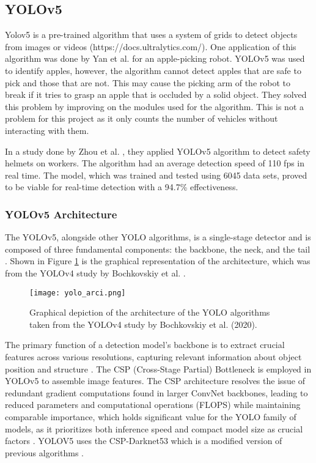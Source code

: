 \subsection{YOLOv5}

Yolov5 is a pre-trained algorithm that uses a system of grids to detect objects from images or videos (https://docs.ultralytics.com/). 
One application of this algorithm was done by Yan et al. \citeyear{yan_2021} for an apple-picking robot. YOLOv5 was used to identify apples, however, the algorithm cannot detect apples that are safe to pick and those that are not. This may cause the picking arm of the robot to break if it tries to grasp an apple that is occluded by a solid object. They solved this problem by improving on the modules used for the algorithm. This is not a problem for this project as it only counts the number of vehicles without interacting with them. 

In a study done by Zhou et al. \citeyear{zhou_2021}, they applied YOLOv5 algorithm to detect safety helmets on workers. The algorithm had an average detection speed of 110 fps in real time. The model, which was trained and tested using 6045 data sets, proved to be viable for real-time detection with a 94.7\% effectiveness.


\subsubsection{YOLOv5 Architecture}
The YOLOv5, alongside other YOLO algorithms, is a single-stage detector and is composed of three fundamental components: the backbone, the neck, and the tail \cite{Solawetz_2020}. Shown in Figure \ref{fig:yolo_archi} is the graphical representation of the architecture, which was from the YOLOv4 study by Bochkovskiy et al. \citeyear{Bochkovskiy_Wang_Liao_2020}.

\begin{figure}[!htbp]
	\texttt{[image: yolo\_arci.png]}
	\caption{Graphical depiction of the architecture of the YOLO algorithms taken from the YOLOv4 study by Bochkovskiy et al. (2020).}
	\label{fig:yolo_archi}
\end{figure}
\FloatBarrier


The primary function of a detection model's backbone is to extract crucial features across various resolutions, capturing relevant information about object position and structure \cite{Kateb_2021}. The CSP (Cross-Stage Partial) Bottleneck is employed in YOLOv5 to assemble image features. The CSP architecture resolves the issue of redundant gradient computations found in larger ConvNet backbones, leading to reduced parameters and computational operations (FLOPS) while maintaining comparable importance, which holds significant value for the YOLO family of models, as it prioritizes both inference speed and compact model size as crucial factors \cite{Solawetz_2020}. YOLOV5 uses the CSP-Darknet53 which is a modified version of previous algorithms \cite{Jocher_Waxmann_2023}.

